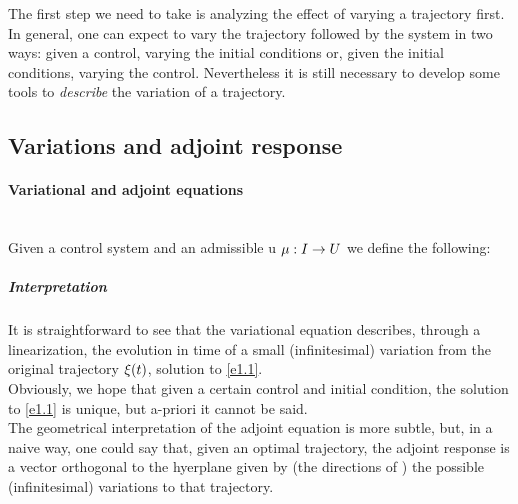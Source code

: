 The first step we need to take is analyzing the effect of varying a trajectory first. In general, one can expect to vary the trajectory followed by the system in two ways: given a control, varying the initial conditions or, given the initial conditions, varying the control. Nevertheless it is still necessary to develop some tools to \textit{describe} the variation of a trajectory. 

\subsection{Variations and adjoint response}


\paragraph{Variational and adjoint equations}\mbox{}\\
Given a control system \controlSystem\space and an admissible u $\mu:I\rightarrow U$ we define the following:

\subparagraph{Interpretation}It is straightforward to see that the variational equation describes, through a linearization,  the evolution in time of a small (infinitesimal) variation from the original trajectory $\xi (t)$, solution to \eqref{e1.1}.\\
Obviously, we hope that given a certain control and initial condition, the solution to \eqref{e1.1} is unique, but a-priori it cannot be said.\\
The geometrical interpretation of the adjoint equation is more subtle, but, in a naive way, one could say that, given an optimal trajectory, the adjoint response is a vector orthogonal to the hyerplane given by (the directions of ) the possible (infinitesimal) variations to that trajectory. 



